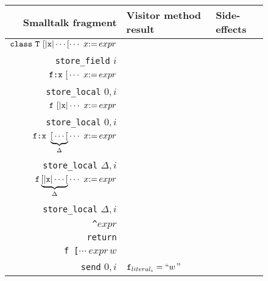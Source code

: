 \documentclass[11pt]{article}
\begin{document}
\begin{figure}
\begin{center}
\begin{tabular}[t]{r | l | l }
{\bf Smalltalk fragment} & {\bf Visitor method result} & {\bf Side-effects}\\
\hline
${\tt class~ T~[|x| }\cdots [ \cdots~ x {\tt :=} \,expr$ &
\begin{minipage}[t]{0.25\linewidth}
$expr$\\
{\tt store\_field} $i$
\end{minipage} & \\

$\text{\tt f:}{\tt x~[}\cdots~ x {\tt :=} \,expr$ &
\begin{minipage}[t]{0.25\linewidth}
$expr$\\
{\tt store\_local} $0, i$
\end{minipage} & \\

${\tt f~[|x| }\cdots~ x {\tt :=} \,expr$ &
\begin{minipage}[t]{0.25\linewidth}
$expr$\\
{\tt store\_local} $0, i$
\end{minipage} & \\

$\text{\tt f:}{\tt x~}\underbrace{{\tt [}\cdots [}_{\Delta}\cdots~ x {\tt :=} \,expr$ &
\begin{minipage}[t]{0.25\linewidth}
$expr$\\
{\tt store\_local} $\Delta, i$
\end{minipage} & \\

$\text{\tt f}\underbrace{{\tt [|x| }\cdots [}_{\Delta}\cdots~ x {\tt :=} \,expr$ &
\begin{minipage}[t]{0.25\linewidth}
$expr$\\
{\tt store\_local} $\Delta, i$
\end{minipage} & \\

{\tt\Large \verb=^=}$expr$ &
\begin{minipage}[t]{0.25\linewidth}
$expr$\\
{\tt return}\vspace{5pt}
\end{minipage} & \\

{\tt f\,[}$\cdots ~expr \,w$ &
\begin{minipage}[t]{0.25\linewidth}
$expr$\\
{\tt send} $0,i$\vspace{5pt}
\end{minipage}  & $\text{\tt f}_{literal_i} = ``w$'' \\


\end{tabular}
\end{center}
\end{figure}
\end{document}
